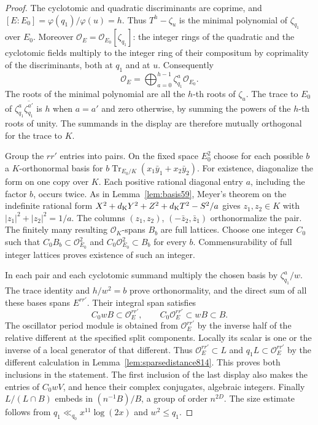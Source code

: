\documentclass[a4paper,11pt]{article}
\theoremstyle{definition}
\theoremstyle{remark}
\numberwithin{equation}{section}
\newcommand{\OO}{\mathcal O}
\begin{document}
\begin{proof}
The cyclotomic and quadratic discriminants are coprime, and
\([E:E_0]=\varphi(q_1)/\varphi(u)=h\). Thus
\(T^h-\zeta_u\) is the minimal polynomial of \(\zeta_{q_1}\)
over \(E_0\). Moreover \(\OO_E=\OO_{E_0}[\zeta_{q_1}]\):
the integer rings of the quadratic and the cyclotomic fields
multiply to the integer ring of their compositum by coprimality
of the discriminants, both at \(q_1\) and at \(u\).
Consequently
\[
                \OO_E=\bigoplus_{a=0}^{h-1}
                           \zeta_{q_1}^a\OO_{E_0}.
\]
The roots of the minimal polynomial are all the \(h\)-th roots
of \(\zeta_u\). The trace to \(E_0\) of
\(\zeta_{q_1}^a\overline{\zeta_{q_1}^{a'}}\) is \(h\) when
\(a=a'\) and zero otherwise, by summing the powers of the
\(h\)-th roots of unity. The summands in the display are
therefore mutually orthogonal for the trace to \(K\).

Group the \(rr'\) entries into pairs. On the fixed space
\(E_0^2\) choose for each possible \(b\) a \(K\)-orthonormal
basis for \(b\operatorname{Tr}_{E_0/K}(x_1\bar y_1+x_2\bar y_2)\).
For existence, diagonalize the form on one copy over \(K\).
Each positive rational diagonal entry \(a\), including the
factor \(b\), occurs twice. As in Lemma~\ref{lem:basis59},
Meyer's theorem on the indefinite rational form
\(X^2+d_{\rm K}Y^2+Z^2+d_{\rm K}T^2-S^2/a\) gives
\(z_1,z_2\in K\) with \(|z_1|^2+|z_2|^2=1/a\). The columns
\((z_1,z_2)\), \((-\bar z_2,\bar z_1)\) orthonormalize
the pair. The finitely many resulting \(\OO_K\)-spans \(B_b\)
are full lattices. Choose one integer \(C_0\) such that
\(C_0 B_b\subset\OO_{E_0}^2\) and
\(C_0\OO_{E_0}^2\subset B_b\) for every \(b\).
Commensurability of full integer lattices proves existence of
such an integer.

In each pair and each cyclotomic summand multiply the
chosen basis by \(\zeta_{q_1}^a/w\). The trace identity and
\(h/w^2=b\) prove orthonormality, and the direct sum of all
these bases spans \(E^{rr'}\). Their integral span satisfies
\[
 C_0 w B\subset\OO_E^{rr'},\qquad
 C_0\OO_E^{rr'}\subset w B\subset B .
\]
The oscillator period module is obtained from \(\OO_E^{rr'}\)
by the inverse half of the relative different at the specified
split components. Locally its scalar is one or the inverse
of a local generator of that different. Thus
\(\OO_E^{rr'}\subset L\) and \(q_1 L\subset\OO_E^{rr'}\)
by the different calculation in Lemma~\ref{lem:sparsedistance814}.
This proves both inclusions in the statement. The first
inclusion of the last display also makes the entries of
\(C_0wV\), and hence their complex conjugates, algebraic
integers. Finally \(L/(L\cap B)\) embeds in
\((n^{-1}B)/B\), a group of order \(n^{2D}\). The size estimate
follows from \(q_1\ll_{q_0} x^{11}\log(2x)\) and \(w^2\le q_1\).
\end{proof}
\end{document}
